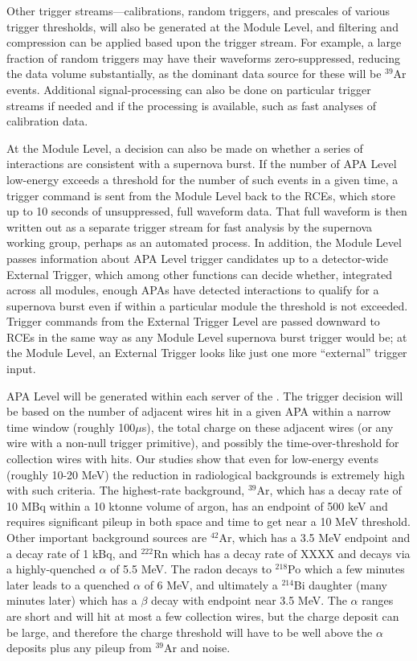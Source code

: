 	Other trigger streams---calibrations, random triggers, and prescales of
various trigger thresholds, will also be generated at the Module Level, and
filtering and compression can be applied based upon the trigger stream. For
example, a large fraction of random triggers may have their waveforms
zero-suppressed, reducing the data volume substantially, as the dominant data
source for these will be $^{39}$Ar events. Additional signal-processing can
also be done on particular trigger streams if needed and if the processing is
available, such as fast analyses of calibration data.

       At the Module Level, a decision can also be made on whether a series of
interactions are consistent with a supernova burst.  If the number of APA Level
low-energy  exceeds a threshold for the number of such events
in a given time, a trigger command is sent from the Module Level back to the
RCEs, which store up to 10 seconds of unsuppressed, full waveform data.  That
full waveform is then written out as a separate trigger stream for fast
analysis by the supernova working group, perhaps as an automated process.  In
addition, the Module Level passes information about APA Level trigger
candidates  up to a detector-wide External Trigger, which among other functions
can decide whether, integrated across all modules, enough APAs have detected
interactions to qualify for a supernova burst even if within a particular
module the threshold is not exceeded. Trigger commands from the External Trigger
Level are passed downward to RCEs in the same way as any Module Level supernova
burst trigger would be; at the Module Level, an External Trigger looks like
just one more ``external'' trigger input.

	APA Level  will be generated within each server of the .  The trigger decision will be based on the number of adjacent wires hit
in a given APA within a narrow time window (roughly 100$\mu$s), the total
charge on these adjacent wires (or any wire with a non-null trigger primitive),
and possibly the time-over-threshold for collection wires with hits. Our
studies show that even for low-energy events (roughly 10-20 MeV) the reduction
in radiological backgrounds is extremely high with such criteria. The
highest-rate background, $^{39}$Ar, which has a decay rate of 10 MBq within a
10 ktonne volume of argon, has an endpoint of 500 keV and requires significant
pileup in both space and time to get near a 10 MeV threshold. Other important
background sources are $^{42}$Ar, which has a 3.5 MeV endpoint and a decay rate
of 1 kBq, and $^{222}$Rn which has a decay rate of XXXX and decays via a
highly-quenched $\alpha$ of 5.5 MeV.  The radon decays to $^{218}$Po which
a few minutes later leads to a quenched $\alpha$ of 6 MeV, and ultimately a
$^{214}$Bi daughter (many minutes later) which has a $\beta$ decay with
endpoint near 3.5 MeV.  The $\alpha$ ranges are short and will hit at most a
few collection wires, but the charge deposit can be large, and therefore the
charge threshold will have to be well above the $\alpha$ deposits plus any
pileup from $^{39}$Ar and noise.

